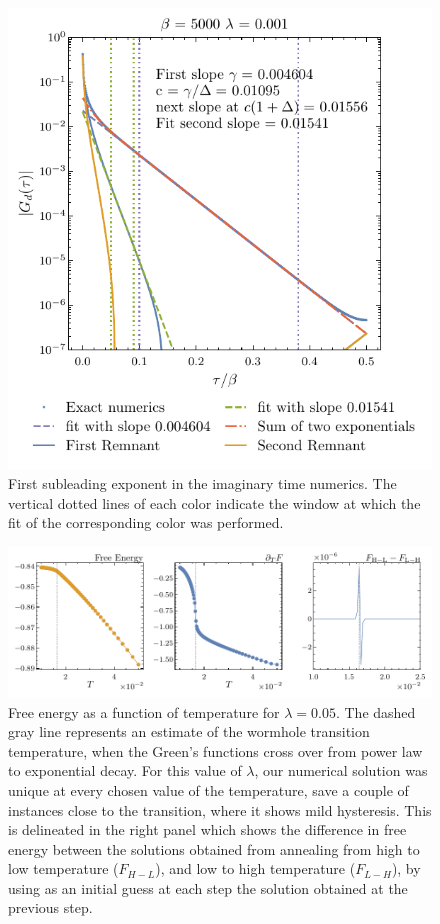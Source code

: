 \begin{figure}[!t]
    \centering
    \includegraphics[width=0.5\linewidth]{figures/chapter3/ExponentsGD.pdf}%
    \caption{First subleading exponent in the imaginary time numerics. The vertical dotted lines of each color indicate the window at which the fit of the corresponding color was performed.}
    \label{fig:subleadingexponentGD}
\end{figure}

\begin{figure}[!t]
    \centering
    \includegraphics[width=0.9\linewidth]{figures/chapter3/ButterFlyPlot.pdf}
    \caption{Free energy as a function of temperature for $\lambda = 0.05$. The dashed gray line represents an estimate of the wormhole transition temperature, when the Green's functions cross over from power law to exponential decay. For this value of $\lambda$, our numerical solution was unique at every chosen value of the temperature, save a couple of instances close to the transition, where it shows mild hysteresis. This is delineated in the right panel which shows the difference in free energy between the solutions obtained from annealing from high to low temperature ($F_{H-L}$), and low to high temperature ($F_{L-H}$), by using as an initial guess at each step the solution obtained at the previous step.
    }
    \label{fig:butterflyplotmetal}
\end{figure}

